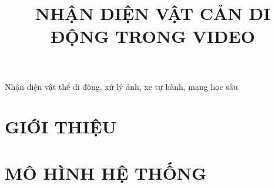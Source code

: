 \documentclass[10pt,conference,a4paper]{IEEEtran}
\begin{document}
\columnsep=0.63cm
\def\mathbi#1{\boldsymbol{#1}}
\def\erfc{\:\mathrm{erfc}}
\def\arg{\:\mathrm{arg}}
\def\E{\:\mathrm{E}}
\def\sinc{\:\mathrm{sinc}}
\def\T{\mathrm{T}}
\def\H{\mathrm{H}}
\newcommand{\bigsize}{\fontsize{16pt}{20pt}\selectfont}

%

\title{NHẬN DIỆN VẬT CẢN DI ĐỘNG TRONG VIDEO}

\author{
}
\maketitle

\begin{abstract}




\end{abstract}

\begin{IEEEkeywords}
Nhận diện vật thể di động, xử lý ảnh, xe tự hành, mạng học sâu
\end{IEEEkeywords}
\IEEEpeerreviewmaketitle
%
\section{GIỚI THIỆU}






%
\section{MÔ HÌNH HỆ THỐNG}
\label{Sec:MoHinhHeThong}




\end{document}
